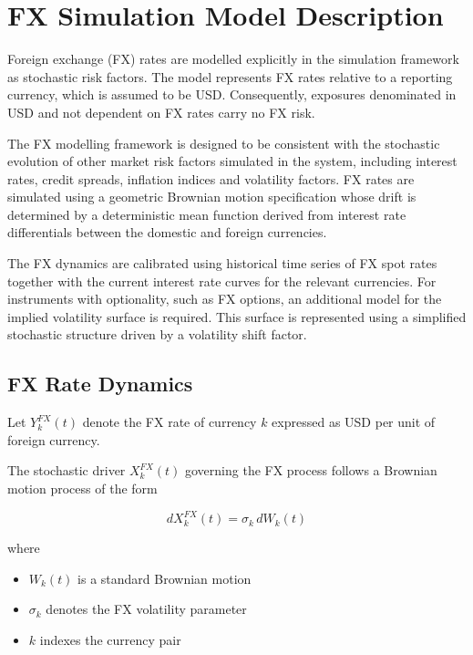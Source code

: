 
\section{FX Simulation Model Description}

 

Foreign exchange (FX) rates are modelled explicitly in the simulation framework as stochastic risk factors. The model represents FX rates relative to a reporting currency, which is assumed to be USD. Consequently, exposures denominated in USD and not dependent on FX rates carry no FX risk.

The FX modelling framework is designed to be consistent with the stochastic evolution of other market risk factors simulated in the system, including interest rates, credit spreads, inflation indices and volatility factors. FX rates are simulated using a geometric Brownian motion specification whose drift is determined by a deterministic mean function derived from interest rate differentials between the domestic and foreign currencies.

The FX dynamics are calibrated using historical time series of FX spot rates together with the current interest rate curves for the relevant currencies. For instruments with optionality, such as FX options, an additional model for the implied volatility surface is required. This surface is represented using a simplified stochastic structure driven by a volatility shift factor.

\subsection{FX Rate Dynamics}

Let $Y_k^{FX}(t)$ denote the FX rate of currency $k$ expressed as USD per unit of foreign currency.

The stochastic driver $X_k^{FX}(t)$ governing the FX process follows a Brownian motion process of the form

\begin{equation}
	dX_k^{FX}(t) = \sigma_k \, dW_k(t)
\end{equation}

where

\begin{itemize}
	\item $W_k(t)$ is a standard Brownian motion
	\item $\sigma_k$ denotes the FX volatility parameter
	\item $k$ indexes the currency pair
\end{itemize}

